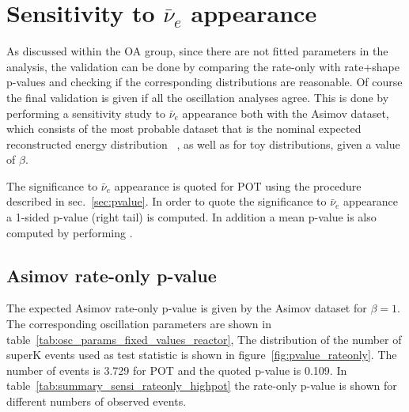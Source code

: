 \clearpage


\section {Sensitivity to $\bar{\nu}_e$ appearance}
\label{sec:sensitivity}

As discussed within the OA group, 
since there are not fitted parameters in the analysis, the validation can 
be done by comparing the rate-only with rate+shape p-values and 
checking if the corresponding distributions are reasonable.
Of course the final validation is given if all the oscillation analyses agree.
This is done by performing a sensitivity study to $\bar{\nu}_e$ appearance
both with the Asimov dataset, which consists of the most probable dataset
that is the nominal expected reconstructed energy distribution ~\cite{Asimov},
as well as for toy distributions, given a value of $\beta$.

The significance to $\bar{\nu}_e$ appearance is quoted for 
\TotalPot POT
using the procedure described in sec.~\ref{sec:pvalue}.
In order to quote the significance to $\bar{\nu}_e$ appearance a 1-sided p-value (right tail) is computed.
In addition a mean p-value is also computed by performing \NumToysLarge.


\subsection {Asimov rate-only p-value}
\label{subsec:rateonly}

The expected Asimov rate-only p-value is given by the Asimov dataset for $\beta=1$. 
The corresponding oscillation parameters are shown in table~\ref{tab:osc_params_fixed_values_reactor},
The distribution of the number of superK events used as test statistic is shown in figure~\ref{fig:pvalue_rateonly}. 
The number of events is
3.729 for \TotalPot POT
and the quoted p-value is 0.109.
In table~\ref{tab:summary_sensi_rateonly_highpot} the rate-only p-value is shown
for different numbers of observed events.


